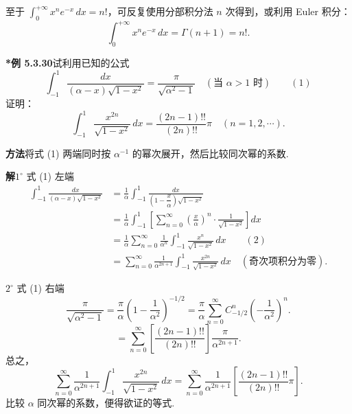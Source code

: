 \documentclass[UTF8,12pt,a4paper,fontset=fandol]{ctexart}
\begin{document}
至于 $\displaystyle\int_0^{+\infty}x^ne^{-x}\,dx=n!$，可反复使用分部积分法 $n$ 次得到，或利用 Euler 积分：
\[
  \int_0^{+\infty}x^ne^{-x}\,dx=\Gamma(n+1)=n!.
\]

\noindent\textbf{*例 5.3.30}\quad 试利用已知的公式
\[
  \int_{-1}^1\frac{dx}{(\alpha-x)\sqrt{1-x^2}}=\frac{\pi}{\sqrt{\alpha^2-1}}
  \quad(\text{当 }\alpha>1\text{ 时}) \qquad(1)
\]
证明：
\[
  \int_{-1}^1\frac{x^{2n}}{\sqrt{1-x^2}}\,dx
  =\frac{(2n-1)!!}{(2n)!!}\pi\quad(n=1,2,\cdots).
\]

\noindent\textbf{方法}\quad 将式 (1) 两端同时按 $\alpha^{-1}$ 的幂次展开，然后比较同次幂的系数.

\noindent\textbf{解}\quad $1^\circ$ 式 (1) 左端
\[
\begin{aligned}
\int_{-1}^1\frac{dx}{(\alpha-x)\sqrt{1-x^2}}
&=\frac1\alpha\int_{-1}^1\frac{dx}{\left(1-\dfrac{x}{\alpha}\right)\sqrt{1-x^2}}\\
&=\frac1\alpha\int_{-1}^1\left[\sum_{n=0}^{\infty}\left(\frac{x}{\alpha}\right)^n\cdot\frac1{\sqrt{1-x^2}}\right]dx\\
&=\frac1\alpha\sum_{n=0}^{\infty}\frac1{\alpha^n}\int_{-1}^1\frac{x^n}{\sqrt{1-x^2}}\,dx\qquad(2)\\
&=\sum_{n=0}^{\infty}\frac1{\alpha^{2n+1}}\int_{-1}^1\frac{x^{2n}}{\sqrt{1-x^2}}\,dx\quad(\text{奇次项积分为零}).
\end{aligned}
\]

$2^\circ$ 式 (1) 右端
\[
  \frac{\pi}{\sqrt{\alpha^2-1}}
  =\frac{\pi}{\alpha}\left(1-\frac1{\alpha^2}\right)^{-1/2}
  =\frac{\pi}{\alpha}\sum_{n=0}^{\infty}C_{-1/2}^n\left(-\frac1{\alpha^2}\right)^n.
\]
\[
  =\sum_{n=0}^{\infty}\left[\frac{(2n-1)!!}{(2n)!!}\right]\frac{\pi}{\alpha^{2n+1}}.
\]
总之，
\[
  \sum_{n=0}^{\infty}\frac1{\alpha^{2n+1}}\int_{-1}^1\frac{x^{2n}}{\sqrt{1-x^2}}\,dx
  =\sum_{n=0}^{\infty}\frac1{\alpha^{2n+1}}\left[\frac{(2n-1)!!}{(2n)!!}\pi\right].
\]
比较 $\alpha$ 同次幂的系数，便得欲证的等式.
\end{document}
